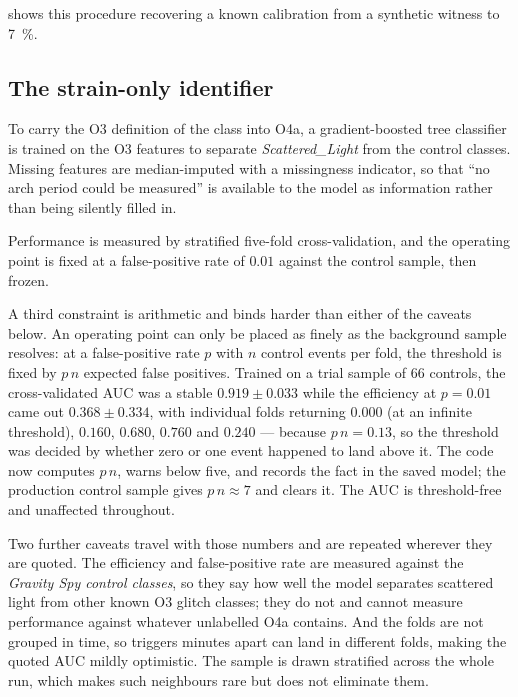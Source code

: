  shows this procedure recovering a known calibration from
a synthetic witness to \SI{7}{\percent}.

\subsection{The strain-only identifier}
\label{sec:methods:classifier}

To carry the O3 definition of the class into O4a, a gradient-boosted tree
classifier \citep{Friedman2001,Pedregosa2011} is trained on the O3 features to
separate \emph{Scattered\_Light} from the control classes. Missing features are
median-imputed with a missingness indicator, so that ``no arch period could be
measured'' is available to the model as information rather than being silently
filled in.

Performance is measured by stratified five-fold cross-validation, and the
operating point is fixed at a false-positive rate of $0.01$ against the
control sample, then frozen.

A third constraint is arithmetic and binds harder than either of the caveats
below. An operating point can only be placed as finely as the background
sample resolves: at a false-positive rate $p$ with $n$ control events per fold,
the threshold is fixed by $p\,n$ expected false positives. Trained on a trial
sample of 66 controls, the cross-validated AUC was a stable
$0.919 \pm 0.033$ while the efficiency at $p = 0.01$ came out
$0.368 \pm 0.334$, with individual folds returning $0.000$ (at an infinite
threshold), $0.160$, $0.680$, $0.760$ and $0.240$ --- because $p\,n = 0.13$,
so the threshold was decided by whether zero or one event happened to land
above it. The code now computes $p\,n$, warns below five, and records the fact
in the saved model; the production control sample gives $p\,n \approx 7$ and
clears it. The AUC is threshold-free and unaffected throughout.

Two further caveats travel with those numbers and are repeated wherever they
are quoted. The efficiency and false-positive rate are measured against the
\emph{Gravity Spy control classes}, so they say how well the model separates
scattered light from other known O3 glitch classes; they do not and cannot
measure performance against whatever unlabelled O4a contains. And the folds
are not grouped in time, so triggers minutes apart can land in different
folds, making the quoted AUC mildly optimistic. The sample is drawn stratified
across the whole run, which makes such neighbours rare but does not eliminate
them.

